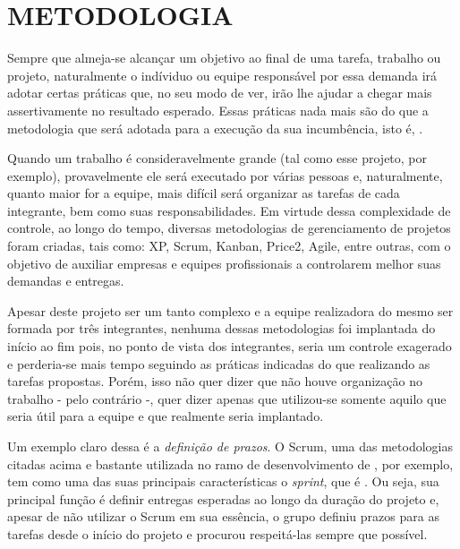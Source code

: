 
\chapter{METODOLOGIA}
\label{chap:metodologia}

Sempre que almeja-se alcançar um objetivo ao final de uma tarefa, trabalho ou projeto, naturalmente o indíviduo ou equipe responsável por essa demanda irá adotar certas práticas que, no seu modo de ver, irão lhe ajudar a chegar mais assertivamente no resultado esperado. Essas práticas nada mais são do que a metodologia que será adotada para a execução da sua incumbência, isto é, \cite{Stoodi18} .

Quando um trabalho é consideravelmente grande (tal como esse projeto, por exemplo), provavelmente ele será executado por várias pessoas e, naturalmente, quanto maior for a equipe, mais difícil será organizar as tarefas de cada integrante, bem como suas responsabilidades. Em virtude dessa complexidade de controle, ao longo do tempo, diversas metodologias de gerenciamento de projetos foram criadas, tais como: XP, Scrum, Kanban, Price2, Agile, entre outras, com o objetivo de auxiliar empresas e equipes profissionais a controlarem melhor suas demandas e entregas.

Apesar deste projeto ser um tanto complexo e a equipe realizadora do mesmo ser formada por três integrantes, nenhuma dessas metodologias foi implantada do início ao fim pois, no ponto de vista dos integrantes, seria um controle exagerado e perderia-se mais tempo seguindo as práticas indicadas do que realizando as tarefas propostas. Porém, isso não quer dizer que não houve organização no trabalho - pelo contrário -, quer dizer apenas que utilizou-se somente aquilo que seria útil para a equipe e que realmente seria implantado.

Um exemplo claro dessa  é a \textit{definição de prazos}. O Scrum, uma das metodologias citadas acima e bastante utilizada no ramo de desenvolvimento de \software{}, por exemplo, tem como uma das suas principais características o \textit{sprint}, que é \cite{Junior17} . Ou seja, sua principal função é definir entregas esperadas ao longo da duração do projeto e, apesar de não utilizar o Scrum em sua essência, o grupo definiu prazos para as tarefas desde o início do projeto e procurou respeitá-las sempre que possível.

